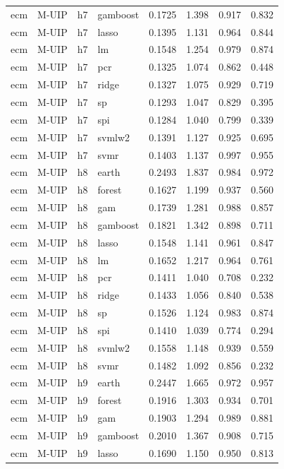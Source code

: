 \begin{ThreePartTable}
\begin{longtable}[t]{llclcccc}
ecm & M-UIP & h7 & gamboost & 0.1725 & 1.398 & 0.917 & 0.832\\
ecm & M-UIP & h7 & lasso & 0.1395 & 1.131 & 0.964 & 0.844\\
ecm & M-UIP & h7 & lm & 0.1548 & 1.254 & 0.979 & 0.874\\
ecm & M-UIP & h7 & pcr & 0.1325 & 1.074 & 0.862 & 0.448\\
ecm & M-UIP & h7 & ridge & 0.1327 & 1.075 & 0.929 & 0.719\\
ecm & M-UIP & h7 & sp & 0.1293 & 1.047 & 0.829 & 0.395\\
ecm & M-UIP & h7 & spi & 0.1284 & 1.040 & 0.799 & 0.339\\
ecm & M-UIP & h7 & svmlw2 & 0.1391 & 1.127 & 0.925 & 0.695\\
ecm & M-UIP & h7 & svmr & 0.1403 & 1.137 & 0.997 & 0.955\\
\addlinespace
ecm & M-UIP & h8 & earth & 0.2493 & 1.837 & 0.984 & 0.972\\
ecm & M-UIP & h8 & forest & 0.1627 & 1.199 & 0.937 & 0.560\\
ecm & M-UIP & h8 & gam & 0.1739 & 1.281 & 0.988 & 0.857\\
ecm & M-UIP & h8 & gamboost & 0.1821 & 1.342 & 0.898 & 0.711\\
ecm & M-UIP & h8 & lasso & 0.1548 & 1.141 & 0.961 & 0.847\\
ecm & M-UIP & h8 & lm & 0.1652 & 1.217 & 0.964 & 0.761\\
ecm & M-UIP & h8 & pcr & 0.1411 & 1.040 & 0.708 & 0.232\\
ecm & M-UIP & h8 & ridge & 0.1433 & 1.056 & 0.840 & 0.538\\
ecm & M-UIP & h8 & sp & 0.1526 & 1.124 & 0.983 & 0.874\\
ecm & M-UIP & h8 & spi & 0.1410 & 1.039 & 0.774 & 0.294\\
ecm & M-UIP & h8 & svmlw2 & 0.1558 & 1.148 & 0.939 & 0.559\\
ecm & M-UIP & h8 & svmr & 0.1482 & 1.092 & 0.856 & 0.232\\
\addlinespace
ecm & M-UIP & h9 & earth & 0.2447 & 1.665 & 0.972 & 0.957\\
ecm & M-UIP & h9 & forest & 0.1916 & 1.303 & 0.934 & 0.701\\
ecm & M-UIP & h9 & gam & 0.1903 & 1.294 & 0.989 & 0.881\\
ecm & M-UIP & h9 & gamboost & 0.2010 & 1.367 & 0.908 & 0.715\\
ecm & M-UIP & h9 & lasso & 0.1690 & 1.150 & 0.950 & 0.813\\

\end{longtable}
\end{ThreePartTable}
